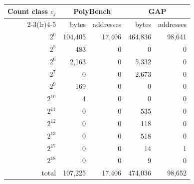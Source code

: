 \begin{tabular}{rrrrr}
\toprule
Count class $c_j$ & \multicolumn{2}{c}{PolyBench} & \multicolumn{2}{c}{GAP} \\
\cmidrule(lr){2-3}\cmidrule(lr){4-5}
 & bytes & addresses & bytes & addresses \\
\midrule
$2^{0}$ & 104,405 & 17,406 & 464,836 & 98,641 \\
$2^{5}$ & 483 & 0 & 0 & 0 \\
$2^{6}$ & 2,163 & 0 & 5,332 & 0 \\
$2^{7}$ & 0 & 0 & 2,673 & 0 \\
$2^{9}$ & 169 & 0 & 0 & 0 \\
$2^{10}$ & 4 & 0 & 0 & 0 \\
$2^{11}$ & 0 & 0 & 535 & 0 \\
$2^{12}$ & 0 & 0 & 118 & 0 \\
$2^{13}$ & 0 & 0 & 518 & 0 \\
$2^{17}$ & 0 & 0 & 14 & 1 \\
$2^{18}$ & 0 & 0 & 9 & 0 \\
\midrule
total & 107,225 & 17,406 & 474,036 & 98,652 \\
\bottomrule
\end{tabular}
